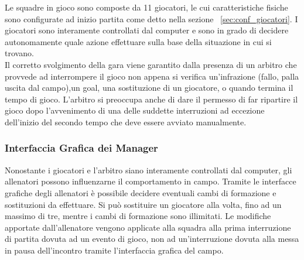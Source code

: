 Le squadre in gioco sono composte da 11 giocatori, le cui caratteristiche fisiche sono configurate ad inizio partita come detto nella sezione ~\ref{sec:conf_giocatori}. I giocatori sono interamente controllati dal computer e sono in grado di decidere autonomamente quale azione effettuare sulla base della situazione in cui si trovano.\\

Il corretto svolgimento della gara viene garantito dalla presenza di un arbitro che provvede ad interrompere il gioco non appena si verifica un'infrazione (fallo, palla uscita dal campo),un goal, una sostituzione di un giocatore, o quando termina il tempo di gioco. L'arbitro si preoccupa anche di dare il permesso di far ripartire il gioco dopo l'avvenimento di una delle suddette interruzioni ad eccezione dell'inizio del secondo tempo che deve essere avviato manualmente.\\

\subsubsection*{Interfaccia Grafica dei Manager}
%
\label{sec:gui_manager} 
Nonostante i giocatori e l'arbitro siano interamente controllati dal computer, gli allenatori possono influenzarne il comportamento in campo. Tramite le interfacce grafiche degli allenatori è possibile decidere eventuali cambi di formazione e sostituzioni da effettuare. Si può sostituire un giocatore alla volta, fino ad un massimo di tre, mentre i cambi di formazione sono illimitati. Le modifiche apportate dall'allenatore vengono applicate alla squadra alla prima interruzione di partita dovuta ad un evento di gioco, non ad un'interruzione dovuta alla messa in pausa dell'incontro tramite l'interfaccia grafica del campo.